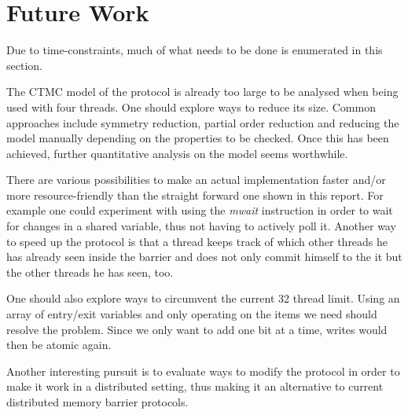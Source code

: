 \documentclass[a4paper, 10pt]{article}
\begin{document}
\section{Future Work}
Due to time-constraints, much of what needs to be done is enumerated in this section.

The CTMC model of the protocol is already too large to be analysed when being used with four threads. One should explore ways to reduce its size. Common approaches include symmetry reduction, partial order reduction and reducing the model manually depending on the properties to be checked. Once this has been achieved, further quantitative analysis on the model seems worthwhile.

There are various possibilities to make an actual implementation faster and/or more resource-friendly than the straight forward one shown in this report. For example one could experiment with using the \emph{mwait} instruction in order to wait for changes in a shared variable, thus not having to actively poll it. Another way to speed up the protocol is that a thread keeps track of which other threads he has already seen inside the barrier and does not only commit himself to the it but the other threads he has seen, too.

One should also explore ways to circumvent the current 32 thread limit. Using an array of entry/exit variables and only operating on the items we need should resolve the problem. Since we only want to add one bit at a time, writes would then be atomic again.

Another interesting pursuit is to evaluate ways to modify the protocol in order to make it work in a distributed setting, thus making it an alternative to current distributed memory barrier protocols.

\nocite{*} %

{}
\end{document}
